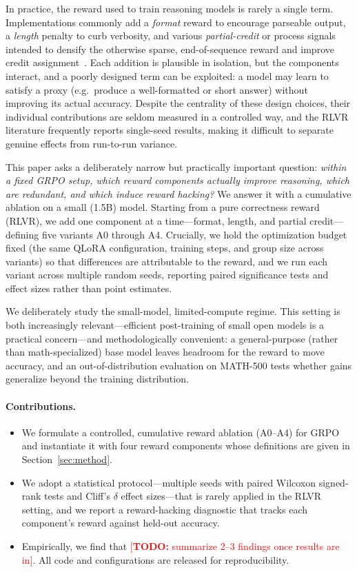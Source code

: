 \documentclass[11pt]{article}
\newcommand{\todo}[1]{\textcolor{red}{[\textbf{TODO:} #1]}}
\begin{document}
In practice, the reward used to train reasoning models is rarely a single term.
Implementations commonly add a \emph{format} reward to encourage parseable
output, a \emph{length} penalty to curb verbosity, and various
\emph{partial-credit} or process signals intended to densify the otherwise
sparse, end-of-sequence reward and improve credit
assignment~\citep{lightman2023}. Each addition is plausible in isolation, but
the components interact, and a poorly designed term can be exploited: a model
may learn to satisfy a proxy (e.g.\ produce a well-formatted or short answer)
without improving its actual accuracy. Despite the centrality of these design
choices, their individual contributions are seldom measured in a controlled way,
and the RLVR literature frequently reports single-seed results, making it
difficult to separate genuine effects from run-to-run variance.

This paper asks a deliberately narrow but practically important question:
\emph{within a fixed GRPO setup, which reward components actually improve
reasoning, which are redundant, and which induce reward hacking?} We answer it
with a cumulative ablation on a small (1.5B) model. Starting from a pure
correctness reward (RLVR), we add one component at a time---format, length, and
partial credit---defining five variants A0 through A4. Crucially, we hold the
optimization budget fixed (the same QLoRA configuration, training steps, and
group size across variants) so that differences are attributable to the reward,
and we run each variant across multiple random seeds, reporting paired
significance tests and effect sizes rather than point estimates.

We deliberately study the small-model, limited-compute regime. This setting is
both increasingly relevant---efficient post-training of small open models is a
practical concern---and methodologically convenient: a general-purpose (rather
than math-specialized) base model leaves headroom for the reward to move
accuracy, and an out-of-distribution evaluation on MATH-500 tests whether gains
generalize beyond the training distribution.

\paragraph{Contributions.}
\begin{itemize}
  \item We formulate a controlled, cumulative reward ablation (A0--A4) for GRPO
  and instantiate it with four reward components whose definitions are given in
  Section~\ref{sec:method}.
  \item We adopt a statistical protocol---multiple seeds with paired Wilcoxon
  signed-rank tests and Cliff's $\delta$ effect sizes---that is rarely applied
  in the RLVR setting, and we report a reward-hacking diagnostic that tracks each
  component's reward against held-out accuracy.
  \item Empirically, we find that \todo{summarize 2--3 findings once results are
  in}. All code and configurations are released for reproducibility.
\end{itemize}
\end{document}
